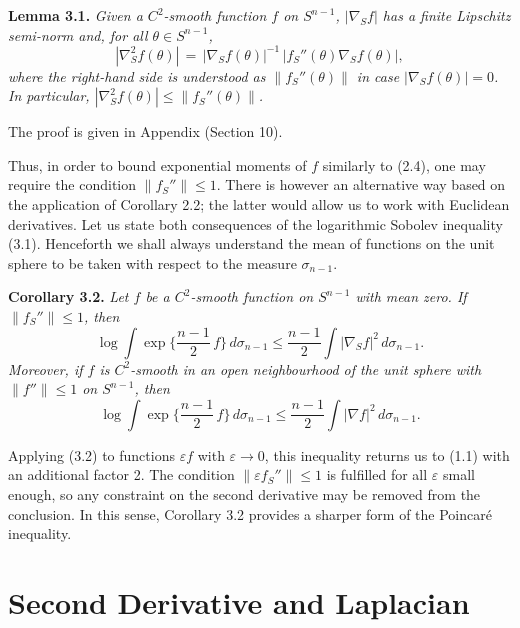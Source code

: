 \documentclass[reqno,12pt]{amsart}
\theoremstyle{plain}
\begin{document}
\vskip5mm
{\bf Lemma 3.1.} {\it Given a $C^2$-smooth function $f$ on $S^{n-1}$, 
$|\nabla_S f|$ has a finite Lipschitz semi-norm and, for all 
$\theta \in S^{n-1}$,
$$
|\nabla_S^2 f(\theta)| \, = \,
|\nabla_S f(\theta)|^{-1}\, |f_S''(\theta)\nabla_S f(\theta)|,
$$
where the right-hand side is understood as $\|f_S''(\theta)\|$ in case 
$|\nabla_S f(\theta)| = 0$. In particular,
$|\nabla_S^2 f(\theta)| \leq \|f_S''(\theta)\|$.
}

\vskip5mm
The proof is given in Appendix (Section 10).

Thus, in order to bound exponential moments of $f$ similarly to (2.4), 
one may require the condition $\|f_S''\| \leq 1$. There is however 
an alternative way based on the application of Corollary 2.2;
the latter would allow us to work with Euclidean derivatives. 
Let us state both consequences of the logarithmic Sobolev inequality (3.1).
Henceforth we shall always understand the mean of functions on the unit 
sphere to be taken with respect to the measure $\sigma_{n-1}$.

\vskip5mm
{\bf Corollary 3.2.} {\it Let $f$ be a $C^2$-smooth function on $S^{n-1}$
with mean zero. If $\|f_S''\| \leq 1$, then
\begin{equation}
\log
\int \exp\Big\{\frac{n-1}{2}\, f\Big\}\,d\sigma_{n-1} \leq 
\frac{n-1}{2} \int |\nabla_S f|^2\,d\sigma_{n-1}.
\end{equation}
Moreover, if $f$ is $C^2$-smooth in an open neighbourhood of the unit 
sphere with $\|f''\| \leq 1$ on $S^{n-1}$, then
\begin{equation}
\log
\int \exp\Big\{\frac{n-1}{2}\, f\Big\}\,d\sigma_{n-1} \leq 
\frac{n-1}{2} \int |\nabla f|^2\,d\sigma_{n-1}.
\end{equation}
}

Applying (3.2) to functions ${\varepsilon} f$ with ${\varepsilon} \rightarrow 0$, this 
inequality returns us to (1.1) with an additional factor 2. The condition 
$\|{\varepsilon} f_S''\| \leq 1$ is fulfilled for all ${\varepsilon}$ small enough, so any 
constraint on the second derivative may be removed from the conclusion. 
In this sense, Corollary 3.2 provides a sharper form of the Poincar\'e 
inequality.

\vskip10mm
\section{{\bf Second Derivative and Laplacian}}
\setcounter{equation}{0}
\end{document}
